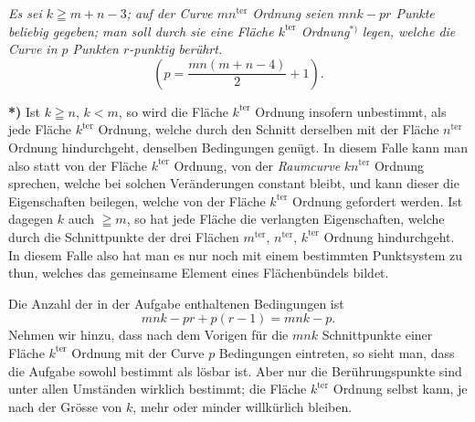 \documentclass{article}
\begin{document}
\emph{Es sei $k\geqq m+n-3$; auf der Curve $mn^{\text{ter}}$ Ordnung seien $mnk-pr$ Punkte beliebig gegeben; man soll durch sie eine Fläche $k^{\text{ter}}$ Ordnung}${}^{*)}$ \emph{legen, welche die Curve in $p$ Punkten $r$-punktig berührt.}
\[
\left(p=\frac{mn(m+n-4)}{2}+1\right).
\]

\textbf{*)} Ist $k\geqq n$, $k<m$, so wird die Fläche $k^{\text{ter}}$ Ordnung insofern unbestimmt, als jede Fläche $k^{\text{ter}}$ Ordnung, welche durch den Schnitt derselben mit der Fläche $n^{\text{ter}}$ Ordnung hindurchgeht, denselben Bedingungen genügt. In diesem Falle kann man also statt von der Fläche $k^{\text{ter}}$ Ordnung, von der \emph{Raumcurve} $kn^{\text{ter}}$ Ordnung sprechen, welche bei solchen Veränderungen constant bleibt, und kann dieser die Eigenschaften beilegen, welche von der Fläche $k^{\text{ter}}$ Ordnung gefordert werden. Ist dagegen $k$ auch $\geqq m$, so hat jede Fläche die verlangten Eigenschaften, welche durch die Schnittpunkte der drei Flächen $m^{\text{ter}}$, $n^{\text{ter}}$, $k^{\text{ter}}$ Ordnung hindurchgeht. In diesem Falle also hat man es nur noch mit einem bestimmten Punktsystem zu thun, welches das gemeinsame Element eines Flächenbündels bildet.


Die Anzahl der in der Aufgabe enthaltenen Bedingungen ist
\[
mnk-pr+p(r-1) = mnk-p.
\]
Nehmen wir hinzu, dass nach dem Vorigen für die $mnk$ Schnittpunkte einer Fläche $k^{\text{ter}}$ Ordnung mit der Curve $p$ Bedingungen eintreten, so sieht man, dass die Aufgabe sowohl bestimmt als lösbar ist. Aber nur die Berührungspunkte sind unter allen Umständen wirklich bestimmt; die Fläche $k^{\text{ter}}$ Ordnung selbst kann, je nach der Grösse von $k$, mehr oder minder willkürlich bleiben.
\end{document}
